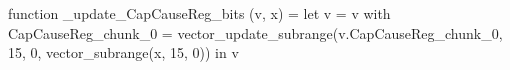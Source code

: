 function _update_CapCauseReg_bits (v, x) = let v = { v with CapCauseReg_chunk_0 = vector_update_subrange(v.CapCauseReg_chunk_0, 15, 0, vector_subrange(x, 15, 0)) } in v
